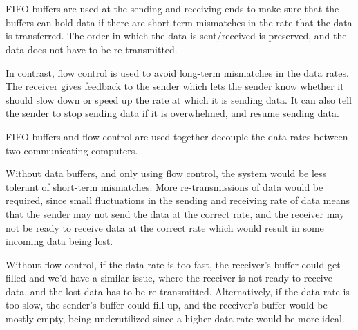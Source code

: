 \section{}
FIFO buffers are used at the sending and receiving ends to make sure that 
the buffers can hold data if there are short-term mismatches in the rate that
the data is transferred. The order in which the data is sent/received is
preserved, and the data does not have to be re-transmitted. 

In contrast, flow control is used to avoid long-term mismatches in the data
rates. The receiver gives feedback to the sender which lets the sender know
whether it should slow down or speed up the rate at which it is sending data. 
It can also tell the sender to stop sending data if it is overwhelmed, and
resume sending data. 

FIFO buffers and flow control are used together decouple the data rates between
two communicating computers. 

Without data buffers, and only using flow control, the system would be less
tolerant of short-term mismatches. More re-transmissions of data would be
required, since small fluctuations in the sending and receiving rate of data
means that the sender may not send the data at the correct rate, and the receiver
may not be ready to receive data at the correct rate 
which would result in some incoming data being lost.

Without flow control, if the data rate is too fast, the receiver's buffer could
get filled and we'd have a similar issue, where the receiver is not ready to
receive data, and the lost data has to be re-transmitted. Alternatively, if
the data rate is too slow, the sender's buffer could fill up, and the receiver's
buffer would be mostly empty, being underutilized since a higher data rate would
be more ideal. 

